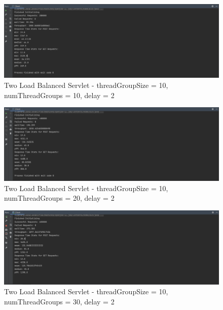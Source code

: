 \documentclass[a4paper,12pt]{article} %
\begin{document}
\begin{enumerate}
\begin{figure}[H]
    \centering
    \includegraphics[width=\textwidth]{images/two_servlet_10.png}
    \caption{Two Load Balanced Servlet - threadGroupSize = 10, numThreadGroups = 10, delay = 2}
\end{figure}
\begin{figure}[H]
    \centering
    \includegraphics[width=\textwidth]{images/two_servlet_20.png}
    \caption{Two Load Balanced Servlet - threadGroupSize = 10, numThreadGroups = 20, delay = 2}
\end{figure}
\begin{figure}[H]
    \centering
    \includegraphics[width=\textwidth]{images/two_server_30.png}
    \caption{Two Load Balanced Servlet - threadGroupSize = 10, numThreadGroups = 30, delay = 2}
\end{figure}


\end{enumerate}
\end{document}
